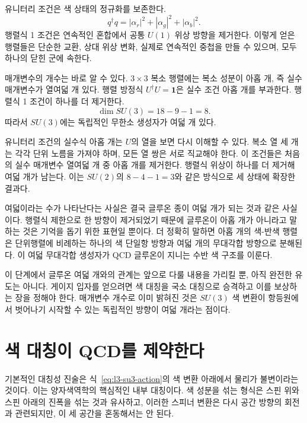 유니터리 조건은 색 상태의 정규화를 보존한다.
\begin{equation}
q^\dagger q
=|\alpha_r|^2+|\alpha_g|^2+|\alpha_b|^2.
\end{equation}
행렬식 1 조건은 연속적인 혼합에서 공통 \(U(1)\) 위상 방향을 제거한다. 이렇게 얻은 행렬들은 단순한 교환, 상대 위상 변화, 실제로 연속적인 중첩을 만들 수 있으며, 모두 하나의 닫힌 군에 속한다.

매개변수의 개수는 바로 알 수 있다. \(3\times3\) 복소 행렬에는 복소 성분이 아홉 개, 즉 실수 매개변수가 열여덟 개 있다. 행렬 방정식 \(U^\dagger U=\boldsymbol 1\)은 실수 조건 아홉 개를 부과한다. 행렬식 1 조건이 하나를 더 제거한다.
\begin{equation}
\dim SU(3)=18-9-1=8.
\end{equation}
따라서 \(SU(3)\)에는 독립적인 무한소 생성자가 여덟 개 있다.

유니터리 조건의 실수식 아홉 개는 \(U\)의 열을 보면 다시 이해할 수 있다. 복소 열 세 개는 각각 단위 노름을 가져야 하며, 모든 열 쌍은 서로 직교해야 한다. 이 조건들은 처음의 실수 매개변수 열여덟 개 중 아홉 개를 제거한다. 행렬식 위상이 하나를 더 제거해 여덟 개가 남는다. 이는 \(SU(2)\)의 \(8-4-1=3\)와 같은 방식으로 세 상태에 확장한 결과다.

여덟이라는 수가 나타난다는 사실은 결국 글루온 종이 여덟 개가 되는 것과 같은 사실이다. 행렬식 제한으로 한 방향이 제거되었기 때문에 글루온이 아홉 개가 아니라고 말하는 것은 기억을 돕기 위한 표현일 뿐이다. 더 정확히 말하면 아홉 개의 색-반색 행렬은 단위행렬에 비례하는 하나의 색 단일항 방향과 여덟 개의 무대각합 방향으로 분해된다. 이 여덟 무대각합 생성자가 QCD 글루온이 지니는 수반 색 구조를 이룬다.

이 단계에서 글루온 여덟 개와의 관계는 앞으로 다룰 내용을 가리킬 뿐, 아직 완전한 유도는 아니다. 게이지 입자를 얻으려면 색 대칭을 국소 대칭으로 승격하고 이를 보상하는 장을 정해야 한다. 매개변수 개수로 이미 밝혀진 것은 \(SU(3)\) 색 변환이 항등원에서 벗어나기 시작할 수 있는 독립적인 방향이 여덟 개라는 점이다.

\section{색 대칭이 QCD를 제약한다}

기본적인 대칭성 진술은 식~\eqref{eq:l3-su3-action}의 색 변환 아래에서 물리가 불변이라는 것이다. 이는 양자색역학의 핵심적인 내부 대칭이다. 색 성분을 섞는 형식은 스핀 위와 스핀 아래의 진폭을 섞는 것과 유사하고, 이러한 스피너 변환은 다시 공간 방향의 회전과 관련되지만, 이 세 공간을 혼동해서는 안 된다.

